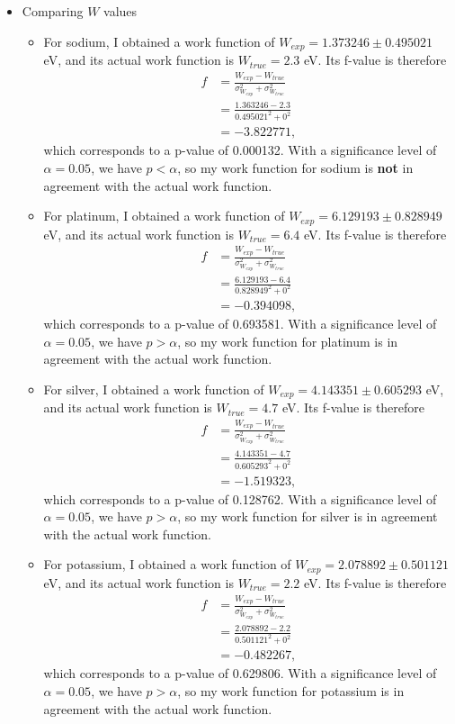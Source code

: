 \documentclass{article}
\begin{document}
\begin{itemize}
\item Comparing $W$ values
  \begin{itemize}
  \item For sodium, I obtained a work function of $W_{exp}=1.373246\pm 0.495021$ eV, and its actual work function is $W_{true}=2.3$ eV. Its f-value is therefore
    \begin{align*}
      f &= \frac{W_{exp}-W_{true}}{\sigma_{W_{exp}}^2 + \sigma_{W_{true}}^2} \\
      &= \frac{1.363246-2.3}{0.495021^2+0^2} \\
      &= -3.822771,
    \end{align*}
    which corresponds to a p-value of 0.000132. With a significance level of $\alpha = 0.05$, we have $p < \alpha$, so  my work function for sodium is \textbf{not} in agreement with the actual work function.
    
  \item For platinum, I obtained a work function of $W_{exp}=6.129193\pm 0.828949$ eV, and its actual work function is $W_{true}=6.4$ eV. Its f-value is therefore
    \begin{align*}
      f &= \frac{W_{exp}-W_{true}}{\sigma_{W_{exp}}^2 + \sigma_{W_{true}}^2} \\
      &= \frac{6.129193-6.4}{0.828949^2+0^2} \\
      &= -0.394098,
    \end{align*}
    which corresponds to a p-value of 0.693581. With a significance level of $\alpha = 0.05$, we have $p > \alpha$, so  my work function for platinum is in agreement with the actual work function.

  \item For silver, I obtained a work function of $W_{exp}=4.143351\pm 0.605293$ eV, and its actual work function is $W_{true}=4.7$ eV. Its f-value is therefore
    \begin{align*}
      f &= \frac{W_{exp}-W_{true}}{\sigma_{W_{exp}}^2 + \sigma_{W_{true}}^2} \\
      &= \frac{4.143351-4.7}{0.605293^2+0^2} \\
      &= -1.519323,
    \end{align*}
    which corresponds to a p-value of 0.128762. With a significance level of $\alpha = 0.05$, we have $p > \alpha$, so  my work function for silver is in agreement with the actual work function.

  \item For potassium, I obtained a work function of $W_{exp}=2.078892\pm 0.501121$ eV, and its actual work function is $W_{true}=2.2$ eV. Its f-value is therefore
    \begin{align*}
      f &= \frac{W_{exp}-W_{true}}{\sigma_{W_{exp}}^2 + \sigma_{W_{true}}^2} \\
      &= \frac{2.078892-2.2}{0.501121^2+0^2} \\
      &= -0.482267,
    \end{align*}
    which corresponds to a p-value of 0.629806. With a significance level of $\alpha = 0.05$, we have $p > \alpha$, so  my work function for potassium is in agreement with the actual work function.
    

\end{itemize}
\end{itemize}
\end{document}
